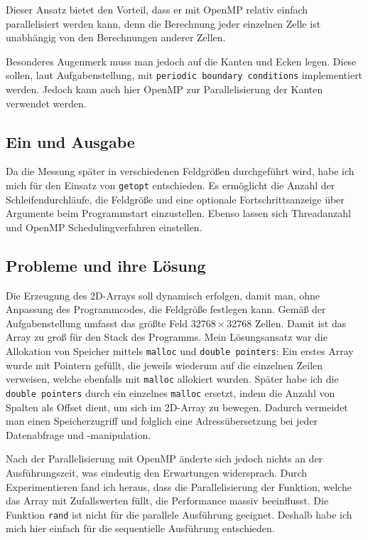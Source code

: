 \documentclass[german,plainarticle,hyperref,utf8]{zihpub}
\begin{document}
	Dieser Ansatz bietet den Vorteil, dass er mit OpenMP relativ einfach parallelisiert werden kann, denn die Berechnung jeder einzelnen Zelle ist unabhängig von den Berechnungen anderer Zellen.
	
	Besonderes Augenmerk muss man jedoch auf die Kanten und Ecken legen. Diese sollen, laut Aufgabenstellung, mit \verb|periodic boundary conditions| implementiert werden. Jedoch kann auch hier OpenMP zur Parallelisierung der Kanten verwendet werden.

	\subsection{Ein und Ausgabe}
	Da die Messung später in verschiedenen Feldgrößen durchgeführt wird, habe ich mich für den Einsatz von \verb|getopt| entschieden. Es ermöglicht die Anzahl der Schleifendurchläufe, die Feldgröße und eine optionale Fortschrittsanzeige über Argumente beim Programmstart einzustellen.
	Ebenso lassen sich Threadanzahl und OpenMP Schedulingverfahren einstellen.
	
	\subsection{Probleme und ihre Lösung}
	Die Erzeugung des 2D-Arrays soll dynamisch erfolgen, damit man, ohne Anpassung des Programmcodes, die Feldgröße festlegen kann. Gemäß der Aufgabenstellung umfasst das größte Feld $32768\times 32768$ Zellen. Damit ist das Array zu groß für den Stack des Programms.
	Mein Lösungsansatz war die Allokation von Speicher mittels \verb|malloc| und \verb|double pointers|: Ein erstes Array wurde mit Pointern gefüllt, die jeweils wiederum auf die einzelnen Zeilen verweisen, welche ebenfalls mit \verb|malloc| allokiert wurden.
	Später habe ich die \verb|double pointers| durch ein einzelnes \verb|malloc| ersetzt, indem die Anzahl von Spalten als Offset dient, um sich im 2D-Array zu bewegen. Dadurch vermeidet man einen Speicherzugriff und folglich eine Adressübersetzung bei jeder Datenabfrage und -manipulation.
	
	Nach der Parallelisierung mit OpenMP änderte sich jedoch nichts an der Ausführungszeit, was eindeutig den Erwartungen widersprach. Durch Experimentieren fand ich heraus, dass die Parallelisierung der Funktion, welche das Array mit Zufallswerten füllt, die Performance massiv beeinflusst. Die Funktion \verb|rand| ist nicht für die parallele Ausführung geeignet. Deshalb habe ich mich hier einfach für die sequentielle Ausführung entschieden.
	
\end{document}
